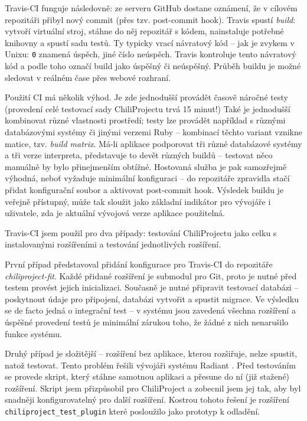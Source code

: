 \documentclass[thesis=B,czech]{FITthesis}[2012/05/02]
\begin{document}
Travis-CI funguje následovně: ze serveru GitHub dostane oznámení, že v cílovém
repozitáři přibyl nový \gls{commit} (přes tzv. post-commit hook). Travis
spustí \emph{build}: vytvoří virtuální stroj, stáhne do něj repozitář
s kódem, nainstaluje potřebné knihovny a spustí sadu testů. Ty typicky
vrací návratový kód -- jak je zvykem v Unixu: \lstinline!0! znamená
úspěch, jiné číslo neúspěch. Travis kontroluje tento návratový kód a
podle toho označí build jako úspěšný či neúspěšný. Průběh buildu je
možné sledovat v reálném čase přes webové rozhraní.

Použití \gls{CI} má několik výhod. Je zde jednodušší provádět časově
náročné testy (provedení celé testovací sady ChiliProjectu trvá 15
minut!) Také je jednodušší kombinovat různé vlastnosti
prostředí; testy lze provádět například s různými databázovými systémy
či jinými verzemi Ruby -- kombinací těchto variant vznikne matice, tzv.
\emph{build matrix}. Má-li aplikace podporovat tři různé databázové systémy
a tři verze interpreta, představuje to devět různých buildů -- testovat
něco manuálně by bylo přinejmenším obtížné. Hostovaná služba je pak
samozřejmě výhodná, neboť vyžaduje minimální konfiguraci -- do
repozitáře zpravidla stačí přidat konfigurační soubor a aktivovat
post-commit hook. Výsledek buildu je veřejně přístupný, může tak sloužit
jako základní indikátor pro vývojáře i uživatele, zda je aktuální
vývojová verze aplikace použitelná.

Travis-CI jsem použil pro dva případy: testování ChiliProjectu jako
celku s instalovanými rozšířeními a testování jednotlivých
rozšíření.

První případ představoval přidání konfigurace pro Travis-CI do
repozitáře \emph{chiliproject-fit}. Každé přidané rozšíření je
\gls{submodul} pro Git, proto je nutné před testem provést jejich
inicializaci. Současně je nutné připravit testovací databázi --
poskytnout údaje pro připojení, databázi vytvořit a spustit migrace. Ve
výsledku se de facto jedná o integrační test -- v systému jsou zavedená
všechna rozšíření a úspěšné provedení testů je minimální zárukou toho,
že žádné z nich nenarušilo funkce systému.

Druhý případ je složitější -- rozšíření bez aplikace, kterou rozšiřuje,
nelze spustit, natož testovat. Tento problém řešili vývojáři systému
Radiant \citep{Muhl2012}. Před testováním se provede skript, který
stáhne samotnou aplikaci a přesune do ní (již stažené) rozšíření. Skript
jsem přizpůsobil pro ChiliProject a zobecnil jsem jej tak, aby byl snadněji
konfigurovatelný pro další rozšíření. Kostrou tohoto řešení je rozšíření
\lstinline!chiliproject_test_plugin! které posloužilo jako prototyp
k odladění.
\end{document}
